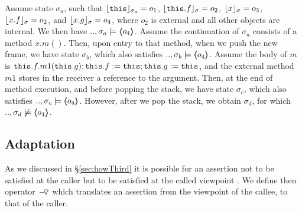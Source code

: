 \begin{example}
\label{ex:motivate:scoped}
Assume state $\sigma_a$, such that $\interpret {\sigma_a} {\prg{this}}=o_1$, $\interpret {\sigma} {\prg{this}.f}=o_2$, $\interpret {\sigma} {x}=o_3$, $\interpret {\sigma} {x.f}=o_2$,  
and $\interpret {\sigma} {x.g}=o_4$, where $o_2$ is external and all other objects are internal. 
We then have $..,\sigma_a \models  \inside {o_4}$.
Assume %
 the continuation of $\sigma_a$   consists of a method $x.m()$. Then,
upon entry to that method, when we push the new frame, we have  state $\sigma_b$, which also satisfies $..,\sigma_b \models  \inside {o_4}$.
Assume %
 the   body of $m$ is $\prg{this}.f.m1(\prg{this}.g); \prg{this}.f := \prg{this};  \prg{this}.g := \prg{this}$, and %
 the external method $m1$ stores in the 
receiver a reference to the argument.
Then, at the end of method execution, and before popping the stack, we have   state $\sigma_c$, which also satisfies $..,\sigma_c \models  \inside {o_4}$.
However, after we pop the stack, we obtain $\sigma_d$, for which $..,\sigma_d \not\models  \inside {o_4}$.
\end{example}


   
 \subsection{Adaptation } %
 \label{s:preserve:encaps}
 \label{s:viewAndProtect}
 
 As we discussed in \S  \ref{sec:howThird} it is possible for an assertion  not to be satisfied at the caller
but to be  satisfied at the called viewpoint . %
We define then operator $\FIXSymbolA$ which  translates an assertion from the viewpoint of the callee, to that of the caller.

